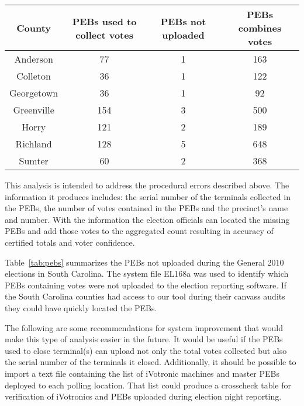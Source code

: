 \begin{table*}
    \begin{center}
    \begin{tabular}{| c | c | c | c |}
    \hline                   
    County &PEBs used to collect votes &PEBs not uploaded &PEBs combines votes\\
    \hline
    Anderson &77 &1 &163\\
    \hline
    Colleton &36 &1 &122\\
    \hline
    Georgetown &36 &1 &92\\
    \hline
    Greenville &154 &3 &500\\
    \hline
    Horry &121 &2 &189\\
    \hline
    Richland &128 &5 &648\\
    \hline
    Sumter &60 &2 &368\\
    \hline
    \end{tabular}
    \end{center}
    \caption{PEBs not uploaded}
    \label{tab:pebs}
\end{table*}
This analysis is intended to address the procedural errors described above. The information it produces includes: the serial number of the terminals collected in the PEBs, the number of votes contained in the PEBs and the precinct's name and number. With the information the election officials can located the missing PEBs and add those votes to the aggregated count resulting in accuracy of certified totals and voter confidence.

Table~\ref{tab:pebs} summarizes the PEBs not uploaded during the General 2010 elections in South Carolina. The system file EL168a was used to identify which PEBs containing votes were not uploaded to the election reporting software. If the South Carolina counties had access to our tool during their canvass audits they could have quickly located the PEBs.

The following are some recommendations for system improvement that would make this type of analysis easier in the future.  It would be useful if the PEBs used to close terminal(s) can upload not only the total votes collected but also the serial number of the terminals it closed. Additionally, it should be possible to import a text file containing the list of iVotronic machines and master PEBs deployed to each polling location.  That list could produce a crosscheck table for verification of iVotronics and PEBs uploaded during election night reporting.

